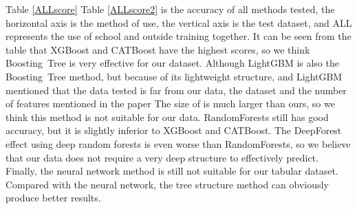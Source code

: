\documentclass[conference]{IEEEtran}
\begin{document}
Table \ref{ALLscore} Table \ref{ALLscore2} is the accuracy of all methods tested, the horizontal axis is the method of use, the vertical axis is the test dataset, and ALL represents the use of school and outside training together. It can be seen from the table that XGBoost and CATBoost have the highest scores, so we think Boosting~Tree is very effective for our dataset. Although LightGBM is also the Boosting~Tree method, but because of its lightweight structure, and LightGBM\cite{ke2017lightgbm} mentioned that the data tested is far from our data, the dataset and the number of features mentioned in the paper The size of is much larger than ours, so we think this method is not suitable for our data. RandomForests still has good accuracy, but it is slightly inferior to XGBoost and CATBoost. The DeepForest effect using deep random forests is even worse than RandomForests, so we believe that our data does not require a very deep structure to effectively predict. Finally, the neural network method is still not suitable for our tabular dataset. Compared with the neural network, the tree structure method can obviously produce better results.

\begin{table}[h]
\centering 
\caption{Score summary table}\label{ALLscore}
\end{table}

\begin{table}[h]
\centering 
\caption{Score summary table}\label{ALLscore2}
\end{table}
\end{document}

